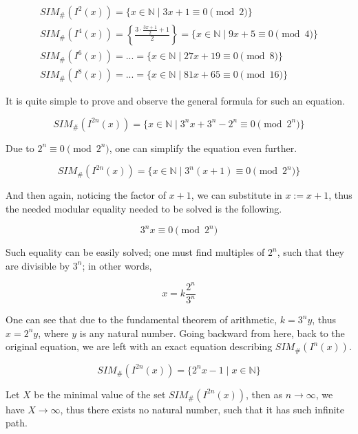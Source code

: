 \documentclass{article}
\begin{document}
\begin{align*}
	SIM_\#(I^2(x)) = \{ x \in \mathbb{N} \mid 3x + 1 \equiv 0 \pmod{2} \} \\
	SIM_\#(I^4(x)) = \left \{ \frac{3 \cdot \frac{3x + 1}{2} + 1}{2} \right \} =  \{ x \in \mathbb{N} \mid 9x + 5 \equiv 0 \pmod{4} \} \\
	SIM_\#(I^6(x)) =  ... =  \{ x \in \mathbb{N} \mid 27x + 19 \equiv 0 \pmod{8} \} \\
	SIM_\#(I^8(x)) =  ... =  \{ x \in \mathbb{N} \mid 81x + 65 \equiv 0 \pmod{16} \}
\end{align*}

It is quite simple to prove and observe the general formula for such an equation.

\begin{equation}
	SIM_\#(I^{2n}(x)) =  \{ x \in \mathbb{N} \mid 3^n x + 3^n - 2^n \equiv 0 \pmod{2^n} \}
\end{equation}

Due to \(2^n \equiv 0 \pmod{2^n}\), one can simplify the equation even further.

\begin{equation}
	SIM_\#(I^{2n}(x)) =  \{ x \in \mathbb{N} \mid 3^n (x + 1) \equiv 0 \pmod{2^n} \}
\end{equation}

And then again, noticing the factor of \(x + 1\), we can substitute in \(x := x + 1\), thus the needed modular equality needed to be solved is the following.

\begin{equation}
	3^n x \equiv 0 \pmod{2^n}
\end{equation}

Such equality can be easily solved; one must find multiples of \(2^n\), such that they are divisible by \(3^n\); in other words,

\begin{equation}
	x = k \frac{2^n}{3^n}
\end{equation}

One can see that due to the fundamental theorem of arithmetic, \(k = 3^{n} y\), thus \(x = 2^n y\), where \(y\) is any natural number. Going backward from here, back to the original equation, we are left with an exact equation describing \(SIM_\#(I^n(x))\).

\begin{equation}
	SIM_\#(I^{2n}(x)) =  \{ 2^nx - 1 \mid x \in \mathbb{N} \}
\end{equation}

Let \(X\) be the minimal value of the set \(SIM_\#(I^{2n}(x))\), then as \(n \rightarrow \infty\), we have \(X \rightarrow \infty\), thus there exists no natural number, such that it has such infinite path.
\end{document}
